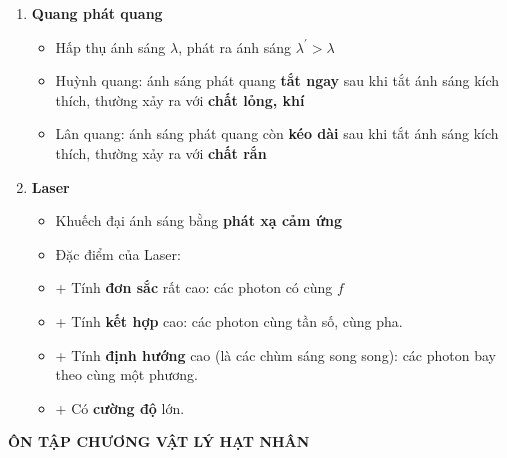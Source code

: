 \documentclass[a4paper,12pt,titlepage,twocolumn]{article}
\newenvironment{myitemize} 
{ \begin{itemize}[leftmargin=*,label=-]  %
		\setlength{\itemsep}{0pt}
		\setlength{\parskip}{0pt}
		\setlength{\parsep}{0pt}     }
{ \end{itemize}                  }
\newenvironment{myenumerate}
{ \begin{enumerate}[label=\textbf{\arabic*}.]
\setlist{nolistsep} %
\setlength{\itemsep}{0pt}
\setlength{\parskip}{0pt}
\setlength{\parsep}{0pt}	}
{ \end{enumerate}}
\begin{document}
\begin{myenumerate}
\begin{myitemize}
	\end{myitemize}
	\textepsilon{} $=hf=\dfrac{hc}{\lambda}=E_{n} - E_{m}$ \\
	số vạch max $=\dfrac{n(n-1)}{2}$ \\
	$F = \dfrac{ke^2}{r^2} = ma_{ht} = \dfrac{mv^2}{r}$ \\
	Tia X: $\dfrac{hc}{\lambda_{min}} = hf_{max} = eU_{AK} = W_{\textit{đ}A}$
	\item \textbf{Quang phát quang}
	\begin{myitemize}
		\item Hấp thụ ánh sáng $\lambda$, phát ra ánh sáng $\lambda^\prime > \lambda$
		\item Huỳnh quang: ánh sáng phát quang \textbf{tắt ngay} sau khi tắt ánh sáng kích thích, thường xảy ra với \textbf{chất lỏng, khí}
		\item Lân quang: ánh sáng phát quang còn \textbf{kéo dài} sau khi tắt ánh sáng kích thích, thường xảy ra với \textbf{chất rắn} \\
	\end{myitemize} 
	\item \textbf{Laser}
	\begin{myitemize}
		\item Khuếch đại ánh sáng bằng \textbf{phát xạ cảm ứng}
		\item Đặc điểm của Laser:
		\setlength{\itemindent}{0.5cm} %
		\item[+] Tính \textbf{đơn sắc} rất cao: các photon có cùng $f$
		\item[+] Tính \textbf{kết hợp} cao: các photon cùng tần số, cùng pha.
		\item[+] Tính \textbf{định hướng} cao (là các chùm sáng song song): các photon bay theo cùng một phương.
		\item[+] Có \textbf{cường độ} lớn.
	\end{myitemize}
\end{myenumerate}	
\begin{adjustwidth}{-0.2cm}{}
	\begin{center}
		\small\textbf{ÔN TẬP CHƯƠNG VẬT LÝ HẠT NHÂN}
	\end{center}
\end{adjustwidth}
\end{document}
